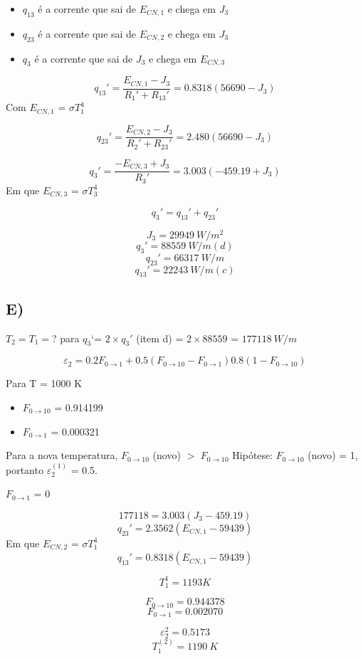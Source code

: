 \begin{itemize}
\item $q_{13}$ é a corrente que sai de $E_{CN,1}$ e chega em $J_{3}$
\item $q_{23}$ é a corrente que sai de $E_{CN,2}$ e chega em $J_{3}$
\item $q_{3}$ é a corrente que sai de $J_{3}$ e chega em $E_{CN,3}$
\end{itemize}

\[q_{13}' = \frac{E_{CN,1}-J_{3}}{R_{1}'+R_{13}'} = 0.8318(56690-J_{3})\]
Com $E_{CN,1}$ = $\sigma T_{1}^{4}$

\[q_{23}' = \frac{E_{CN,2}-J_{3}}{R_{2}'+R_{23}'} = 2.480(56690-J_{3})\]

\[q_{3}' = \frac{-E_{CN,3}+J_{3}}{R_{3}'} = 3.003(-459.19+J_{3})\]
Em que $E_{CN,3}$ = $\sigma T_{3}^{4}$

\[q_{3}'=q_{13}'+q_{23}'\]

\[J_{3} = 29949 \ W/m^{2}\]
\[q_{3}' = 88559 \ W/m (d)\]
\[q_{23}' = 66317 \ W/m \]
\[q_{13}' = 22243 \ W/m (c)\]

\subsection{E)}
$T_{2} = T_{1} = ? $ para $q_{3}$`= $2\times q_{3}'$ (item d) = $2 \times 88559$ = $177118 \ W/m$

\[\varepsilon _{2} = 0.2F_{0 \rightarrow 1} + 0.5(F_{0 \rightarrow 10}-F_{0 \rightarrow 1}) 0.8(1-F_{0 \rightarrow 10})\] 

Para T = 1000 K
\begin{itemize}
\item $F_{0 \rightarrow 10}$ = 0.914199
\item $F_{0 \rightarrow 1}$ = 0.000321
\end{itemize}

Para a nova temperatura, $F_{0 \rightarrow 10}$ (novo) $>$ $F_{0 \rightarrow 10}$ 
Hipótese: $F_{0 \rightarrow 10}$ (novo) = 1, portanto $\varepsilon _{2}^{(1)}$ = 0.5.

$F_{0 \rightarrow 1}$ = 0

\[177118 = 3.003(J_{3}-459.19)\]
\[q_{23}'=2.3562(E_{CN,1}-59439)\]
Em que $E_{CN,2}$ = $\sigma T_{1}^{4}$
\[q_{13}'=0.8318(E_{CN,1}-59439)\]

\[T_{1}^{1}=1193K\]


\[F_{0 \rightarrow 10} = 0.944378\]
\[F_{0 \rightarrow 1} = 0.002070\]

\[\varepsilon _{2}^{2} = 0.5173\]
\[T_{1}^{(2)}=1190 \ K\]

